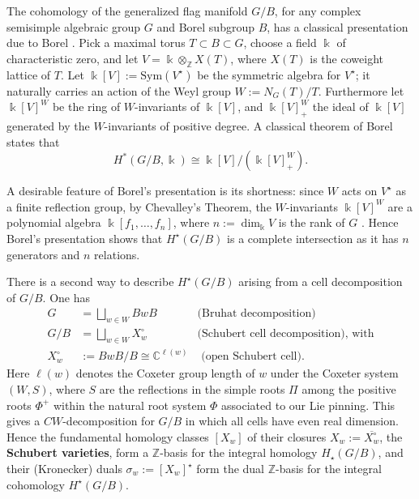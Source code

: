 \documentclass[12pt,dvips]{amsart}
\theoremstyle{plain}
\theoremstyle{definition}
\theoremstyle{remark}
\numberwithin{equation}{section}
\def\ZZ{{\mathbb Z}}
\def\CC{{\mathbb C}}
\def\Sym{\mathrm{Sym}}
\begin{document}
The cohomology of the generalized flag manifold $G/B$, for any complex
semisimple algebraic group $G$ and Borel subgroup $B$, has a classical
presentation due to Borel \cite{Borel}.  Pick a maximal torus
$T\subset B\subset G$, choose a field $\Bbbk$ of characteristic zero, and let
$V=\Bbbk\otimes_{\ZZ} X(T)$, where $X(T)$ is the coweight lattice of
$T$.  Let $\Bbbk[V]:=\Sym(V^{\star})$ be the symmetric algebra for
$V^{\star}$; it naturally carries an action of the Weyl group $W :=
N_G(T)/T$.  Furthermore let $\Bbbk[V]^W$ be the ring of $W$-invariants
of $\Bbbk[V]$, and $\Bbbk[V]^W_+$ the ideal of $\Bbbk[V]$ generated by
the $W$-invariants of positive degree.  A classical theorem of Borel
\cite{Borel} states that
\begin{equation}
\label{Borel-presentation}
H^*(G/B,\Bbbk) \cong \Bbbk[V]/(\Bbbk[V]^W_+).
\end{equation}

A desirable feature of Borel's presentation is its shortness: since $W$
acts on $V^\star$ as a finite reflection group, by Chevalley's Theorem,
the $W$-invariants $\Bbbk[V]^W$ are a polynomial algebra
$\Bbbk[f_1,\ldots,f_n]$, where $n:=\dim_\Bbbk V$ is the rank of
$G$ \cite[Section~3.5]{humphreys}.  Hence Borel's presentation shows
that $H^\star(G/B)$ is a complete intersection as it has $n$ generators and
$n$ relations.

 There is a second way to describe $H^{\star}(G/B)$ arising from
 a cell decomposition of $G/B$. One has
$$
\begin{array}{rll}
G&=\bigsqcup_{w \in W} BwB & \text{(Bruhat decomposition)}\\
G/B&=\bigsqcup_{w \in W} X_w^\circ & \text{(Schubert cell decomposition), with}\\ 
X_w^\circ&:=BwB/B \cong \CC^{\ell(w)} &\text{ (open Schubert cell)}.  
\end{array}
$$ Here $\ell(w)$ denotes the Coxeter group length of $w$ under the
Coxeter system $(W,S)$, where $S$ are the reflections in the simple
roots $\Pi$ among the positive roots $\Phi^+$ 
within the natural root system $\Phi$ associated to our Lie pinning.  
This gives a
$CW$-decomposition for $G/B$ in which all cells have even real
dimension.  Hence the fundamental homology classes $[X_w]$ of their
closures $X_w:=\overline{X_w^\circ}$, the {\bf Schubert varieties},
form a $\ZZ$-basis for the integral homology $H_\star(G/B)$, and their
(Kronecker) duals $\sigma_w:=[X_w]^\star$ form the dual $\ZZ$-basis for
the integral cohomology $H^\star(G/B)$.
\end{document}
